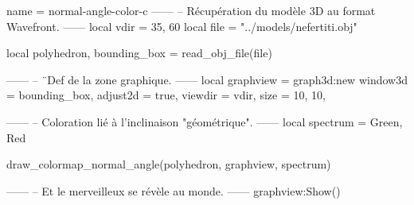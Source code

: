 \documentclass{standalone}
\begin{document}
\begin{luadraw}{name = normal-angle-color-c}
------
-- Récupération du modèle 3D au format Wavefront.
------
local vdir = {35, 60}
local file = "../models/nefertiti.obj"

local polyhedron, bounding_box = read_obj_file(file)

------
-- ¨Def de la zone graphique.
------
local graphview = graph3d:new{
  window3d = bounding_box,
  adjust2d = true,
  viewdir  = vdir,
  size     = {10, 10},
}

------
-- Coloration lié à l'inclinaison "géométrique".
------
local spectrum = {Green, Red}

draw_colormap_normal_angle(polyhedron, graphview, spectrum)

------
-- Et le merveilleux se révèle au monde.
------
graphview:Show()
\end{luadraw}
\end{document}
